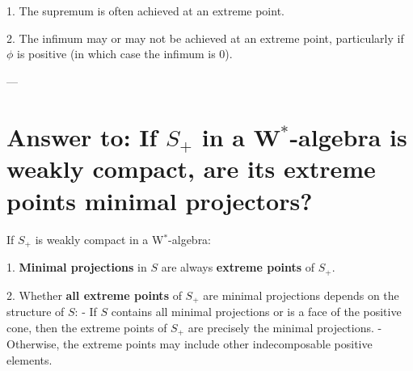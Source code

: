 \documentclass{article}
\begin{document}
1. The supremum is often achieved at an extreme point.

2. The infimum may or may not be achieved at an extreme point, particularly if \( \phi \) is positive (in which case the infimum is \( 0 \)).

---

\section*{Answer to: If \( S_+ \) in a W\(^*\)-algebra is weakly compact, are its extreme points minimal projectors?}

If \( S_+ \) is weakly compact in a W\(^*\)-algebra:

1. \textbf{Minimal projections} in \( S \) are always \textbf{extreme points} of \( S_+ \).

2. Whether \textbf{all extreme points} of \( S_+ \) are minimal projections depends on the structure of \( S \):
   - If \( S \) contains all minimal projections or is a face of the positive cone, then the extreme points of \( S_+ \) are precisely the minimal projections.
   - Otherwise, the extreme points may include other indecomposable positive elements.
\end{document}
